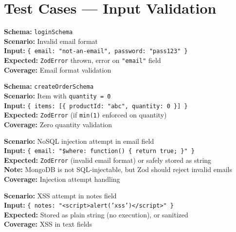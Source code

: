 \documentclass[12pt,a4paper]{report}
\newcommand{\pone}{\textbf{\color{p1red}P1}}
\begin{document}
\section{Test Cases --- Input Validation}

\begin{tcolorbox}[testbox, title={VAL-002 \hfill \pone}]
\textbf{Schema:} \texttt{loginSchema} \\
\textbf{Scenario:} Invalid email format \\
\textbf{Input:} \texttt{\{ email: "not-an-email", password: "pass123" \}} \\
\textbf{Expected:} \texttt{ZodError} thrown, error on \texttt{"email"} field \\
\textbf{Coverage:} Email format validation
\end{tcolorbox}

\begin{tcolorbox}[criticalbox, title={VAL-006 \hfill \pone\ --- Zero Quantity}]
\textbf{Schema:} \texttt{createOrderSchema} \\
\textbf{Scenario:} Item with \texttt{quantity = 0} \\
\textbf{Input:} \texttt{\{ items: [\{ productId: "abc", quantity: 0 \}] \}} \\
\textbf{Expected:} \texttt{ZodError} (if \texttt{min(1)} enforced on quantity) \\
\textbf{Coverage:} Zero quantity validation
\end{tcolorbox}

\begin{tcolorbox}[criticalbox, title={VAL-012 \hfill \pone\ --- Injection Attempt}]
\textbf{Scenario:} NoSQL injection attempt in email field \\
\textbf{Input:} \texttt{\{ email: "\$where: function() \{ return true; \}" \}} \\
\textbf{Expected:} \texttt{ZodError} (invalid email format) or safely stored as string \\
\textbf{Note:} MongoDB is not SQL-injectable, but Zod should reject invalid emails \\
\textbf{Coverage:} Injection attempt handling
\end{tcolorbox}

\begin{tcolorbox}[criticalbox, title={VAL-013 \hfill \pone\ --- XSS Attempt}]
\textbf{Scenario:} XSS attempt in notes field \\
\textbf{Input:} \texttt{\{ notes: "<script>alert('xss')</script>" \}} \\
\textbf{Expected:} Stored as plain string (no execution), or sanitized \\
\textbf{Coverage:} XSS in text fields
\end{tcolorbox}
\end{document}
